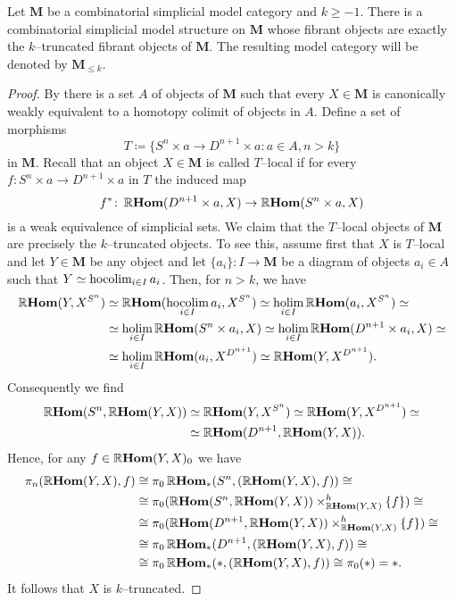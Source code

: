 \begin{theorem}\label{thm:truncated-model-structure-exists}
  Let \(\mathbf{M}\) be a combinatorial simplicial model category and \(k\geq -1\). There is a combinatorial simplicial model structure on \(\mathbf{M}\) whose fibrant objects are exactly the \(k\)--truncated fibrant objects of \(\mathbf{M}\). The resulting model category will be denoted by \(\mathbf{M}_{\leq k}\).
\end{theorem}
\begin{proof}
  By \cite[Prop.~4.7]{mr1870516} there is a set \(A\) of objects of \(\mathbf{M}\) such that every \(X\in\mathbf{M}\) is canonically weakly equivalent to a homotopy colimit of objects in \(A\). Define a set of morphisms
  \[T \coloneqq \{S^{n}\times a \to D^{n+1}\times a : a\in A, n > k \}\]
  in \(\mathbf{M}\). Recall that an object \(X\in\mathbf{M}\) is called \(T\)--local if for every \(f\colon S^{n}\times a\to D^{n+1}\times a\) in \(T\) the induced map
  \[f^{*}\colon \RHom(D^{n+1}\times a, X)\to\RHom(S^{n}\times a, X)\]
  is a weak equivalence of simplicial sets. We claim that the \(T\)--local objects of \(\mathbf{M}\) are precisely the \(k\)--truncated objects. To see this, assume first that \(X\) is \(T\)--local and let \(Y\in\mathbf{M}\) be any object and let \(\{a_{i}\}\colon I\to\mathbf{M}\) be a diagram of objects \(a_{i}\in A\) such that \(Y\simeq \hocolim_{i\in I} a_{i}\). Then, for \(n>k\), we have
  \begin{align*}
    \RHom(Y, X^{S^{n}}) &\simeq \RHom(\hocolim_{i\in I}a_{i}, X^{S^{n}})\simeq \holim_{i\in I}\RHom(a_{i}, X^{S^{n}}) \simeq \\
                        &\simeq \holim_{i\in I} \RHom(S^{n}\times a_{i}, X) \simeq \holim_{i\in I}\RHom(D^{n+1}\times a_{i}, X)\simeq \\
                        &\simeq \holim_{i\in I}\RHom(a_{i}, X^{D^{n+1}})\simeq \RHom(Y, X^{D^{n+1}}).
  \end{align*}
  Consequently we find
  \begin{align*}
    \RHom(S^{n}, \RHom(Y, X)) & \simeq \RHom(Y, X^{S^{n}}) \simeq \RHom(Y, X^{D^{n+1}}) \simeq\\
                              &\simeq \RHom(D^{n+1}, \RHom(Y, X)).
  \end{align*}
  Hence, for any \(f\in\RHom(Y,X)_{0}\) we have
  \begin{align*}
    \pi_{n}(\RHom(Y, X), f) &\cong \pi_{0}\RHom_{*}(S^{n}, (\RHom(Y,X), f)) \cong \\
                            &\cong \pi_{0}(\RHom(S^{n}, \RHom(Y,X))\times^{h}_{\RHom(Y,X)}\{f\}) \cong \\
                            &\cong \pi_{0}(\RHom(D^{n+1}, \RHom(Y,X))\times^{h}_{\RHom(Y,X)}\{f\}) \cong \\
                            &\cong \pi_{0}\RHom_{*}(D^{n+1}, (\RHom(Y,X), f)) \cong \\
                            &\cong \pi_{0}\RHom_{*}(*, (\RHom(Y,X), f)) \cong \pi_{0}(*) = *.
  \end{align*}
  It follows that \(X\) is \(k\)--truncated.


\end{proof}
